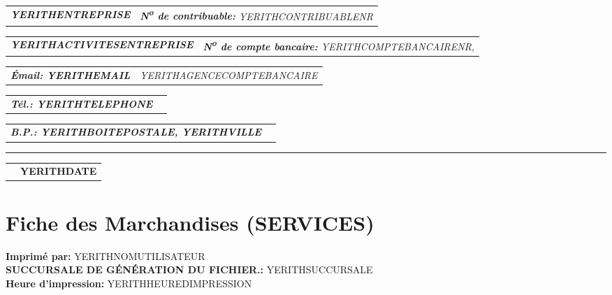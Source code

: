 \documentclass[16pt,YERITHPAPERSPEC]{article} %
\makeatletter
\newcommand{\headerrow}[2]
{\begin{tabular*}{\linewidth}{l@{\extracolsep{\fill}}r}
	#1 &
	#2 \\
\end{tabular*}}
\newcommand{\emphbold}[1]{\textbf{\emph{#1}}\xspace}
\makeatother
\begin{document}
\bigskip

\headerrow
	{\emphbold{YERITHENTREPRISE}}
	{\emph{\textbf{N\textsuperscript{o} de contribuable:} YERITHCONTRIBUABLENR}}
\headerrow
	{\emphbold{YERITHACTIVITESENTREPRISE}}
	{\emph{\textbf{N\textsuperscript{o} de compte bancaire:} YERITHCOMPTEBANCAIRENR,}}
\headerrow
	{\emphbold{\'Email: YERITHEMAIL}}
	{\emph{YERITHAGENCECOMPTEBANCAIRE}}
\headerrow
	{\emphbold{T\'el.: YERITHTELEPHONE}}
	{}
\headerrow
	{\emphbold{B.P.: YERITHBOITEPOSTALE, YERITHVILLE}}
	{}
	
\hrule

\headerrow
	{}
	{\textbf{YERITHDATE}}

\section*{Fiche des Marchandises (SERVICES)}

\textbf{Imprim\'e par:} YERITHNOMUTILISATEUR\\
\textbf{SUCCURSALE DE GÉNÉRATION DU FICHIER.:} YERITHSUCCURSALE\\
\textbf{Heure d'impression:} YERITHHEUREDIMPRESSION

\vspace{0.3cm}
\end{document}
